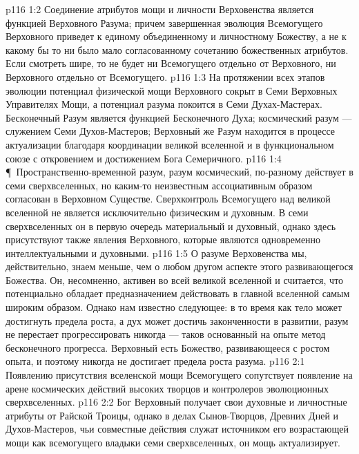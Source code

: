 \vs p116 1:2 Соединение атрибутов мощи и личности Верховенства является функцией Верховного Разума; причем завершенная эволюция Всемогущего Верховного приведет к единому объединенному и личностному Божеству, а не к какому бы то ни было мало согласованному сочетанию божественных атрибутов. Если смотреть шире, то не будет ни Всемогущего отдельно от Верховного, ни Верховного отдельно от Всемогущего.
\vs p116 1:3 На протяжении всех этапов эволюции потенциал физической мощи Верховного сокрыт в Семи Верховных Управителях Мощи, а потенциал разума покоится в Семи Духах\hyp{}Мастерах. Бесконечный Разум является функцией Бесконечного Духа; космический разум --- служением Семи Духов\hyp{}Мастеров; Верховный же Разум находится в процессе актуализации благодаря координации великой вселенной и в функциональном союзе с откровением и достижением Бога Семеричного.
\vs p116 1:4 \P\ Пространственно\hyp{}временной разум, разум космический, по\hyp{}разному действует в семи сверхвселенных, но каким\hyp{}то неизвестным ассоциативным образом согласован в Верховном Существе. Сверхконтроль Всемогущего над великой вселенной не является исключительно физическим и духовным. В семи сверхвселенных он в первую очередь материальный и духовный, однако здесь присутствуют также явления Верховного, которые являются одновременно интеллектуальными и духовными.
\vs p116 1:5 О разуме Верховенства мы, действительно, знаем меньше, чем о любом другом аспекте этого развивающегося Божества. Он, несомненно, активен во всей великой вселенной и считается, что потенциально обладает предназначением действовать в главной вселенной самым широким образом. Однако нам известно следующее: в то время как тело может достигнуть предела роста, а дух может достичь законченности в развитии, разум не перестает прогрессировать никогда --- таков основанный на опыте метод бесконечного прогресса. Верховный есть Божество, развивающееся с ростом опыта, и поэтому никогда не достигает предела роста разума.
\vs p116 2:1 Появлению присутствия вселенской мощи Всемогущего сопутствует появление на арене космических действий высоких творцов и контролеров эволюционных сверхвселенных.
\vs p116 2:2 Бог Верховный получает свои духовные и личностные атрибуты от Райской Троицы, однако в делах Сынов\hyp{}Творцов, Древних Дней и Духов\hyp{}Мастеров, чьи совместные действия служат источником его возрастающей мощи как всемогущего владыки семи сверхвселенных, он мощь актуализирует.
